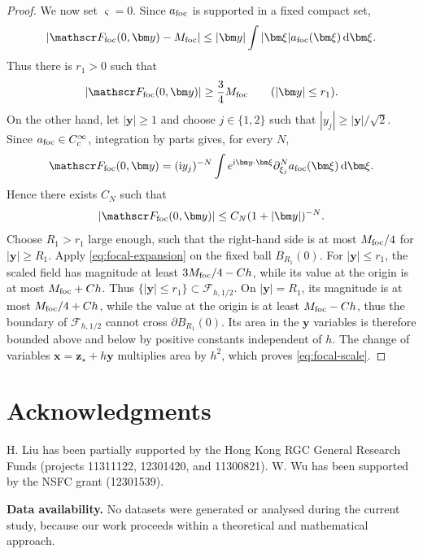 \documentclass[11pt,reqno]{amsart}
\newcommand{\ii}{\mathrm{i}}
\newcommand{\dd}{\,\mathrm{d}}
\numberwithin{equation}{section}
\begin{document}
\begin{proof}
We now set $\varsigma=0$. Since $a_{\rm foc}$ is supported in a fixed compact set,
\begin{equation*}
 |\mathscr F_{\rm foc}(0,\bm y)-M_{\rm foc}|\le |\bm y|\int|\bm\xi|a_{\rm foc}(\bm\xi)\dd\bm\xi.
\end{equation*}
Thus there is $r_1>0$ such that
\begin{equation*}
 |\mathscr F_{\rm foc}(0,\bm y)|\ge\frac34M_{\rm foc}\qquad(|\bm y|\le r_1).
\end{equation*}
On the other hand, let $|\bm y|\ge1$ and choose $j\in\{1,2\}$ such that $|y_j|\ge|\bm y|/\sqrt2$. Since $a_{\rm foc}\in C_c^\infty$, integration by parts gives, for every $N$,
\begin{equation*}
 \mathscr F_{\rm foc}(0,\bm y)=(\ii y_j)^{-N}\int e^{\ii\bm y\cdot\bm\xi}\partial_{\xi_j}^N a_{\rm foc}(\bm\xi)\dd\bm\xi.
\end{equation*}
Hence there exists $C_N$ such that
\begin{equation*}
 |\mathscr F_{\rm foc}(0,\bm y)|\le C_N(1+|\bm y|)^{-N}.
\end{equation*}
Choose $R_1>r_1$ large enough, such that the right-hand side is at most $M_{\rm foc}/4$ for $|\bm y|\ge R_1$. Apply \eqref{eq:focal-expansion} on the fixed ball $B_{R_1}(0)$. For $|\bm y|\le r_1$, the scaled field has magnitude at least $3M_{\rm foc}/4-Ch$, while its value at the origin is at most $M_{\rm foc}+Ch$. Thus $\{|\bm y|\leq r_1\}\subset \mathcal F_{h,1/2}$. On $|\bm y|=R_1$, its magnitude is at most $M_{\rm foc}/4+Ch$, while the value at the origin is at least $M_{\rm foc}-Ch$, thus the boundary of $\mathcal F_{h,1/2}$ cannot cross $\partial B_{R_1}(0)$. Its area in the $\bm y$ variables is therefore bounded above and below by positive constants independent of $h$. The change of variables
$\bm x=\bm z_\star+h\bm y$ multiplies area by $h^2$, which proves \eqref{eq:focal-scale}.
\end{proof}

\section*{Acknowledgments} 
H. Liu has been partially supported by the Hong Kong RGC General Research Funds (projects 11311122, 12301420, and 11300821). W. Wu has been supported by the NSFC grant (12301539).

\textbf{Data availability.} No datasets were generated or analysed during the current study, because our work proceeds within a theoretical and mathematical approach.
\end{document}
